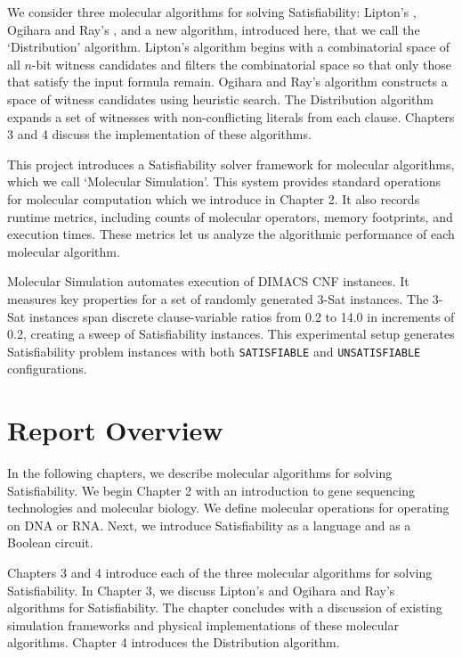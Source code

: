 We consider three molecular algorithms for solving {\sc Satisfiability}: Lipton's \cite{Lipton95usingdna}, Ogihara and Ray's \cite{Ogihara:1996:BFS:898228, Ogihara97dna-basedparallel}, and a new algorithm, introduced here, that we call the `Distribution' algorithm.  Lipton's algorithm begins with a combinatorial space of all $n$-bit witness candidates and filters the combinatorial space so that only those that satisfy the input formula remain.  Ogihara and Ray's algorithm constructs a space of witness candidates using heuristic search.  The Distribution algorithm expands a set of witnesses with non-conflicting literals from each clause.  Chapters 3 and 4 discuss the implementation of these algorithms.

This project introduces a {\sc Satisfiability} solver framework for molecular algorithms, which we call `Molecular Simulation'.  This system provides standard operations for molecular computation which we introduce in Chapter 2.  It also records runtime metrics, including counts of molecular operators, memory footprints, and execution times.  These metrics let us analyze the algorithmic performance of each molecular algorithm.

Molecular Simulation automates execution of DIMACS CNF instances.  It measures key properties for a set of randomly generated $3$-{\sc Sat} instances.  The $3$-{\sc Sat} instances span discrete clause-variable ratios from 0.2 to 14.0 in increments of 0.2, creating a sweep of {\sc Satisfiability} instances.  This experimental setup generates {\sc Satisfiability} problem instances with both \texttt{SATISFIABLE} and \texttt{UNSATISFIABLE} configurations.

\section{Report Overview}

In the following chapters, we describe molecular algorithms for solving {\sc Satisfiability}.  We begin Chapter 2 with an introduction to gene sequencing technologies and molecular biology.  We define molecular operations for operating on DNA or RNA.  Next, we introduce {\sc Satisfiability} as a language and as a Boolean circuit.

Chapters 3 and 4 introduce each of the three molecular algorithms for solving {\sc Satisfiability}.  In Chapter 3, we discuss Lipton's \cite{Lipton95usingdna, dnaComputingModels2008} and Ogihara and Ray's \cite{Ogihara:1996:BFS:898228, Ogihara97dna-basedparallel, dnaBasedImplemetation_Yoshida2000} algorithms for {\sc Satisfiability}.  The chapter concludes with a discussion of existing simulation frameworks and physical implementations of these molecular algorithms.  Chapter 4 introduces the Distribution algorithm.

